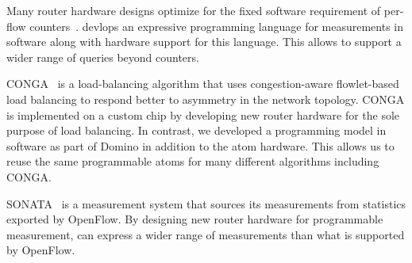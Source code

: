  Many router hardware designs optimize for
the fixed software requirement of per-flow counters~\cite{counter_shah}.
\TheSystem devlops an expressive programming language for measurements in
software along with hardware support for this language. This allows \TheSystem
to support a wider range of queries beyond counters.

 CONGA~\cite{conga} is a load-balancing algorithm that uses
congestion-aware flowlet-based load balancing to respond better to asymmetry in
the network topology. CONGA is implemented on a custom chip by developing new
router hardware for the sole purpose of load balancing. In contrast, we
developed a programming model in software as part of Domino in addition to the
atom hardware. This allows us to reuse the same programmable atoms for many
different algorithms including CONGA.

 SONATA~\cite{streaming-monitoring} is a measurement system that
sources its measurements from statistics exported by OpenFlow. By designing new
router hardware for programmable measurement, \TheSystem can express a wider
range of measurements than what is supported by OpenFlow.
